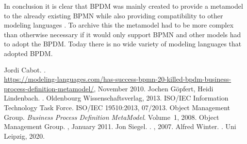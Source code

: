 \documentclass[a4paper,11pt]{article}
\begin{document}
In conclusion it is clear that BPDM was mainly created to provide a metamodel
to the already existing BPMN while also providing compatibility to other
modeling languages \cite{blog}. To archive this the metamodel had to be more
complex than otherwise necessary if it would only support BPMN and other
models had to adopt the BPDM. Today there is no wide variety of
modeling languages that adopted BPDM.

\raggedright
\begin{thebibliography}{xxx}
 Jordi Cabot. .\\
  \url{https://modeling-languages.com/has-success-bpmn-20-killed-bpdm-business-process-definition-metamodel/},
  November 2010.
 Jochen G{\"o}pfert, Heidi Lindenbach.  .  \newblock Oldenbourg
  Wissenschaftsverlag, 2013.
 {ISO/IEC Information Technology Task Force}.  \newblock ISO/IEC
  19510:2013, 07/2013.
 {Object Management Group}.  \emph{Business Process Definition
  MetaModel}. Volume~1, 2008.
 {Object Management Group}.  , January 2011.
 Jon Siegel.  .  , 2007.
 Alfred Winter.  . \newblock Uni Leipzig, 2020.
\end{thebibliography}
%
\end{document}
